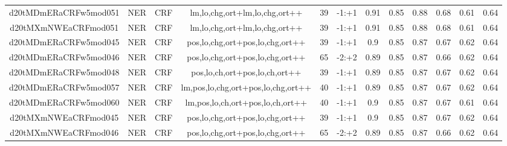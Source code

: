 \documentclass[a4paper]{article}
\begin{document}
\begin{landscape}
\begin{center}
\begin{tabular}{ |c|c|c|c|c|c|c|c|c|c|c|c|}
 
 	
 	\small{ d20tMDmERaCRFw5mod051 } & \small{ NER} & \small{  CRF }  & lm,lo,chg,ort+lm,lo,chg,ort++  &  39 &  \small{  -1:+1 }  &  0.91 & 0.85 & 0.88  &  0.68 & 0.61 & 0.64 \\
 	

 
 	
 	\small{ d20tMXmNWEaCRFmod051 } & \small{ NER} & \small{  CRF }  & lm,lo,chg,ort+lm,lo,chg,ort++  &  39 &  \small{  -1:+1 }  &  0.91 & 0.85 & 0.88  &  0.68 & 0.61 & 0.64 \\
 	

 
 	
 	\small{ d20tMDmERaCRFw5mod045 } & \small{ NER} & \small{  CRF }  & pos,lo,chg,ort+pos,lo,chg,ort++  &  39 &  \small{  -1:+1 }  &  0.9 & 0.85 & 0.87  &  0.67 & 0.62 & 0.64 \\
 	

 
 	
 	\small{ d20tMDmERaCRFw5mod046 } & \small{ NER} & \small{  CRF }  & pos,lo,chg,ort+pos,lo,chg,ort++  &  65 &  \small{  -2:+2 }  &  0.89 & 0.85 & 0.87  &  0.66 & 0.62 & 0.64 \\
 	

 
 	
 	\small{ d20tMDmERaCRFw5mod048 } & \small{ NER} & \small{  CRF }  & pos,lo,ch,ort+pos,lo,ch,ort++  &  39 &  \small{  -1:+1 }  &  0.89 & 0.85 & 0.87  &  0.67 & 0.62 & 0.64 \\
 	

 
 	
 	\small{ d20tMDmERaCRFw5mod057 } & \small{ NER} & \small{  CRF }  & lm,pos,lo,chg,ort+pos,lo,chg,ort++  &  40 &  \small{  -1:+1 }  &  0.89 & 0.85 & 0.87  &  0.67 & 0.62 & 0.64 \\
 	

 
 	
 	\small{ d20tMDmERaCRFw5mod060 } & \small{ NER} & \small{  CRF }  & lm,pos,lo,ch,ort+pos,lo,ch,ort++  &  40 &  \small{  -1:+1 }  &  0.9 & 0.85 & 0.87  &  0.67 & 0.61 & 0.64 \\
 	

 
 	
 	\small{ d20tMXmNWEaCRFmod045 } & \small{ NER} & \small{  CRF }  & pos,lo,chg,ort+pos,lo,chg,ort++  &  39 &  \small{  -1:+1 }  &  0.9 & 0.85 & 0.87  &  0.67 & 0.62 & 0.64 \\
 	

 
 	
 	\small{ d20tMXmNWEaCRFmod046 } & \small{ NER} & \small{  CRF }  & pos,lo,chg,ort+pos,lo,chg,ort++  &  65 &  \small{  -2:+2 }  &  0.89 & 0.85 & 0.87  &  0.66 & 0.62 & 0.64 \\
 	


\end{tabular}
\end{center}
\end{landscape}
\end{document}
